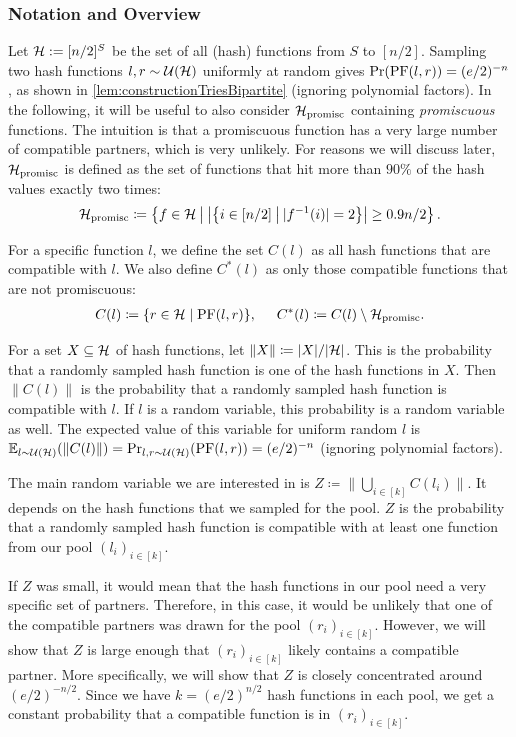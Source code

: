 \documentclass[a4paper,USenglish,cleveref]{lipics-v2021}
\def\cond{\hspace{0.8mm}\middle\vert\hspace{0.8mm}}
\begin{document}
\subsubsection{Notation and Overview}
Let $\mathcal{H} := [n/2]^S$ be the set of all (hash) functions from $S$ to $[n/2]$.
Sampling two hash functions $l,r \sim \mathcal{U}(\mathcal{H})$ uniformly at random gives $\Pr(\mathrm{PF}(l, r)) = (e/2)^{-n}$, as shown in \cref{lem:constructionTriesBipartite} (ignoring polynomial factors).
In the following, it will be useful to also consider $\mathcal{H}_{\textrm{promisc}}$ containing \emph{promiscuous} functions.
The intuition is that a promiscuous function has a very large number of compatible partners, which is very unlikely.
For reasons we will discuss later, $\mathcal{H}_{\textrm{promisc}}$ is defined as the set of functions that hit more than $90\%$ of the hash values exactly two times:
\begin{align*}
  \HProm \coloneqq \left\{ f \in \H \cond \left|\left\{i \in [n/2] \cond |f^{-1}(i)| = 2\right\}\right| \geq 0.9n/2\right\}.
\end{align*}

For a specific function $l$, we define the set $C(l)$ as all hash functions that are compatible with $l$.
We also define $C^*(l)$ as only those compatible functions that are not promiscuous:
\begin{align*}
  C(l) \coloneqq \{ r \in \mathcal{H} \mid \mathrm{PF}(l, r)\},
  \hspace{5mm}
  C^*(l) \coloneqq C(l) \setminus \mathcal{H}_{\textrm{promisc}}.
\end{align*}

For a set $X \subseteq \mathcal{H}$ of hash functions, let $\|X\| \coloneqq |X|/|\mathcal{H}|$.
This is the probability that a randomly sampled hash function is one of the hash functions in $X$.
Then $\|C(l)\|$ is the probability that a randomly sampled hash function is compatible with $l$.
If $l$ is a random variable, this probability is a random variable as well.
The expected value of this variable for uniform random $l$ is $\mathbb{E}_{l \sim \mathcal{U}(\mathcal{H})}(\|C(l)\|) = \Pr_{l,r \sim \mathcal{U}(\mathcal{H})}(\mathrm{PF}(l, r)) = (e/2)^{-n}$ (ignoring polynomial factors).

The main random variable we are interested in is $Z \coloneqq \|\bigcup_{i \in [k]} C(l_i)\|$.
It depends on the hash functions that we sampled for the pool.
$Z$ is the probability that a randomly sampled hash function is compatible with at least one function from our pool $(l_i)_{i\in[k]}$.

If $Z$ was small, it would mean that the hash functions in our pool need a very specific set of partners.
Therefore, in this case, it would be unlikely that one of the compatible partners was drawn for the pool $(r_i)_{i\in[k]}$.
However, we will show that $Z$ is large enough that $(r_i)_{i\in[k]}$ likely contains a compatible partner.
More specifically, we will show that $Z$ is closely concentrated around $(e/2)^{-n/2}$.
Since we have $k=(e/2)^{n/2}$ hash functions in each pool, we get a constant probability that a compatible function is in $(r_i)_{i\in[k]}$.
\end{document}
